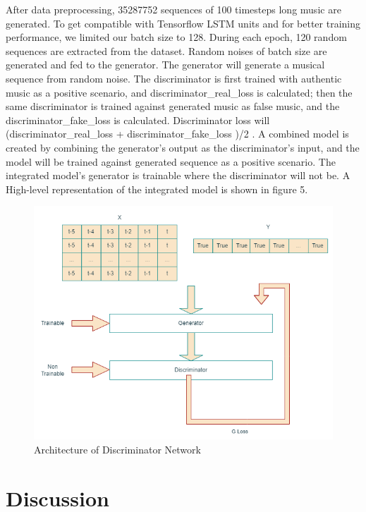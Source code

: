 \documentclass[letterpaper]{article}
\begin{document}
After data preprocessing, 35287752 sequences of 100 timesteps long music are generated. To get compatible with Tensorflow LSTM units and for better training performance, we limited our batch size to 128. During each epoch, 120 random sequences are extracted from the dataset. Random noises of batch size are generated and fed to the generator. The generator will generate a musical sequence from random noise. The discriminator is first trained with authentic music as a positive scenario, and discriminator\_real\_loss is calculated; then the same discriminator is trained against generated music as false music, and the discriminator\_fake\_loss is calculated. Discriminator loss will (discriminator\_real\_loss + discriminator\_fake\_loss )/2 . A combined model is created by combining the generator's output as the discriminator's input, and the model will be trained against generated sequence as a positive scenario. The integrated model's generator is trainable where the discriminator will not be. A High-level representation of the integrated model is shown in figure 5. 

\begin{figure}
\centerline{\includegraphics[scale=.4]{Combined.png}}
\caption{Architecture of Discriminator Network}
\label{fig}
\end{figure}

\section{Discussion}
\end{document}
